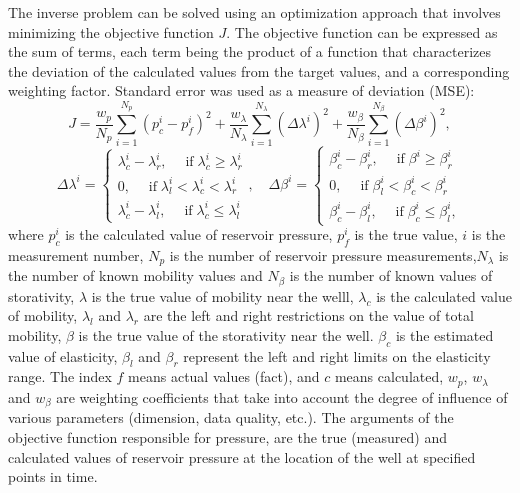 \documentclass[
11pt,%
tightenlines,%
twoside,%
onecolumn,%
nofloats,%
nobibnotes,%
nofootinbib,%
superscriptaddress,%
noshowpacs,%
centertags]%
{revtex4}
\begin{document}
The inverse problem can be solved using an optimization approach that involves minimizing the objective function $J$.
The objective function can be expressed as the sum of terms, each term being the product of a function that characterizes the deviation of the calculated values from the target values, and a corresponding weighting factor. Standard error was used as a measure of deviation (MSE):
\begin{equation} \label{mse}
	J=\frac{w_p}{N_p}\sum_{i=1}^{N_p}{\left(p_c^i-p_f^i\right)^2}+
	\frac{w_{\lambda}}{N_\lambda}\sum_{i=1}^{N_\lambda}{\left(\Delta\lambda^i  \right)^2}+
	\frac{w_{\beta}}{N_\beta}\sum_{i=1}^{N_\beta}{\left(\Delta\beta^i  \right)^2},
\end{equation}
\begin{equation} \label{mse1}
	\Delta\lambda^i  = \left\{\begin{array}{crl}
		\lambda^i_c - \lambda^i_r, \quad \;\mbox{if}\; \lambda^i_c \ge \lambda^i_r\\
		0,\quad \;\mbox{if}\; \lambda^i_l < \lambda^i_c < \lambda^i_r\\
		\lambda^i_c - \lambda^i_l, \quad \;\mbox{if}\;\lambda^i_c \le \lambda^i_l
	\end{array}\right.,
	\quad
	\Delta\beta^i  = \left\{\begin{array}{crl}
		\beta^i_c - \beta^i_r, \quad \;\mbox{if}\; \beta^i \ge \beta^i_r\\
		0,\quad \;\mbox{if}\; \beta^i_l < \beta^i_c < \beta^i_r\\
		\beta^i_c - \beta^i_l, \quad \;\mbox{if}\;\beta^i_c \le \beta^i_l,
	\end{array}\right.
\end{equation}	
where $p_c^i$ is the calculated value of reservoir pressure, $p_f^i$
is the true value, $i$ is the measurement number, $N_p$ is the
number of reservoir pressure measurements,$N_\lambda$ is the
number of known mobility values and $N_\beta$ is the number of known values of storativity, $\lambda$ is the true value of mobility near the welll, $\lambda_c$ is the calculated value of mobility, $\lambda_l$ and $\lambda_r$ are the left and right restrictions on the value of total mobility, $\beta$ is the true value of the storativity near the well. $\beta_c$ is the estimated value of elasticity, $\beta_{l}$ and $\beta_{r}$ represent the left and right limits on the elasticity range. The index $f$ means actual values (fact), and $c$ means calculated, $w_p$, $w_\lambda$ and $w_\beta$ are weighting coefficients that take into account the degree of influence of various parameters (dimension, data quality, etc.). The arguments of the objective function responsible for pressure, are the true (measured) and calculated values of reservoir pressure at the location of the well at specified points in time.
\end{document}
